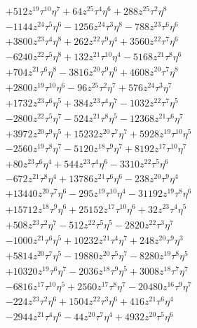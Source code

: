 {\begin{align*}
&+512z^{19}\tau^{10}\eta^{7}+64z^{25}\tau^{4}\eta^{6}+288z^{25}\tau^{2}\eta^{8}\\
&-1144z^{24}\tau^{5}\eta^{6}-1256z^{24}\tau^{3}\eta^{8}-788z^{23}\tau^{6}\eta^{6}\\
&+3800z^{23}\tau^{4}\eta^{8}+262z^{22}\tau^{9}\eta^{4}+3560z^{22}\tau^{7}\eta^{6}\\
&-6240z^{22}\tau^{5}\eta^{8}+132z^{21}\tau^{10}\eta^{4}-5168z^{21}\tau^{8}\eta^{6}\\
&+704z^{21}\tau^{6}\eta^{8}-3816z^{20}\tau^{9}\eta^{6}+4608z^{20}\tau^{7}\eta^{8}\\
&+2800z^{19}\tau^{10}\eta^{6}-96z^{25}\tau^{2}\eta^{7}+576z^{24}\tau^{3}\eta^{7}\\
&+1732z^{23}\tau^{6}\eta^{5}+384z^{23}\tau^{4}\eta^{7}-1032z^{22}\tau^{7}\eta^{5}\\
&-2800z^{22}\tau^{5}\eta^{7}-524z^{21}\tau^{8}\eta^{5}-12368z^{21}\tau^{6}\eta^{7}\\
&+3972z^{20}\tau^{9}\eta^{5}+15232z^{20}\tau^{7}\eta^{7}+5928z^{19}\tau^{10}\eta^{5}\\
&-2560z^{19}\tau^{8}\eta^{7}-5120z^{18}\tau^{9}\eta^{7}+8192z^{17}\tau^{10}\eta^{7}\\
&+80z^{23}\tau^{6}\eta^{4}+544z^{23}\tau^{4}\eta^{6}-3310z^{22}\tau^{5}\eta^{6}\\
&-672z^{21}\tau^{8}\eta^{4}+13786z^{21}\tau^{6}\eta^{6}-238z^{20}\tau^{9}\eta^{4}\\
&+13440z^{20}\tau^{7}\eta^{6}-295z^{19}\tau^{10}\eta^{4}-31192z^{19}\tau^{8}\eta^{6}\\
&+15712z^{18}\tau^{9}\eta^{6}+25152z^{17}\tau^{10}\eta^{6}+32z^{23}\tau^{4}\eta^{5}\\
&+508z^{23}\tau^{2}\eta^{7}-512z^{22}\tau^{5}\eta^{5}-2820z^{22}\tau^{3}\eta^{7}\\
&-1000z^{21}\tau^{6}\eta^{5}+10232z^{21}\tau^{4}\eta^{7}+248z^{20}\tau^{9}\eta^{3}\\
&+5814z^{20}\tau^{7}\eta^{5}-19880z^{20}\tau^{5}\eta^{7}-8280z^{19}\tau^{8}\eta^{5}\\
&+10320z^{19}\tau^{6}\eta^{7}-2036z^{18}\tau^{9}\eta^{5}+3008z^{18}\tau^{7}\eta^{7}\\
&-6816z^{17}\tau^{10}\eta^{5}+2560z^{17}\tau^{8}\eta^{7}-20480z^{16}\tau^{9}\eta^{7}\\
&-224z^{23}\tau^{2}\eta^{6}+1504z^{22}\tau^{3}\eta^{6}+416z^{21}\tau^{6}\eta^{4}\\
&-2944z^{21}\tau^{4}\eta^{6}-44z^{20}\tau^{7}\eta^{4}+4932z^{20}\tau^{5}\eta^{6}\\

\end{align*}}
